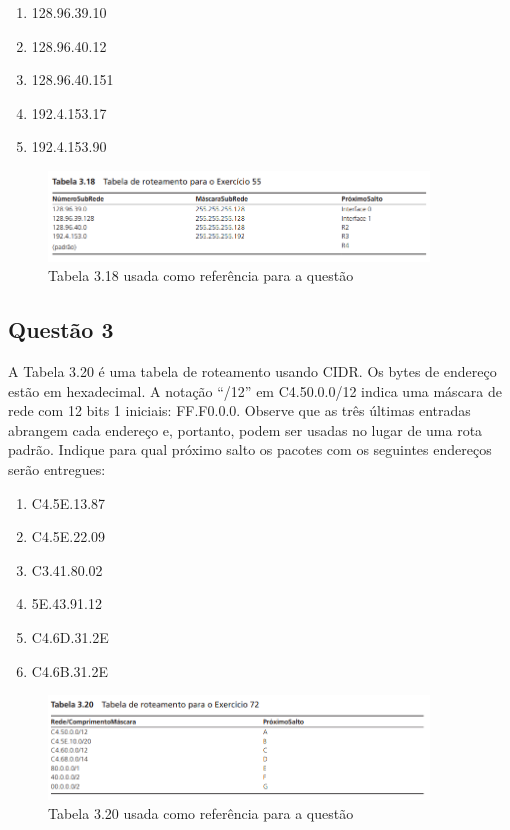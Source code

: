 \begin{enumerate}[label=\alph*.]
    \item 128.96.39.10
    \item 128.96.40.12
    \item 128.96.40.151
    \item 192.4.153.17
    \item 192.4.153.90
\end{enumerate}

\begin{figure}[H]
    \centering
    \includegraphics[width=0.9\textwidth]{images/tabela_3_18.png}
    \caption{Tabela 3.18 usada como referência para a questão} 
    \label{fig:questao_2_tabela}
\end{figure}

\subsection{Questão 3}
A Tabela 3.20 é uma tabela de roteamento usando CIDR. Os bytes de endereço estão em
hexadecimal. A notação “/12” em C4.50.0.0/12 indica uma máscara de rede com 12 bits 1 iniciais:
FF.F0.0.0. Observe que as três últimas entradas abrangem cada endereço e, portanto, podem ser usadas no lugar de uma rota padrão. 
Indique para qual próximo salto os pacotes com os seguintes endereços serão entregues:

\begin{enumerate}[label=\alph*.]
    \item C4.5E.13.87
    \item C4.5E.22.09
    \item C3.41.80.02
    \item 5E.43.91.12
    \item C4.6D.31.2E
    \item C4.6B.31.2E
\end{enumerate}

\begin{figure}[H]
    \centering
    \includegraphics[width=0.9\textwidth]{images/tabela_3_20.png}
    \caption{Tabela 3.20 usada como referência para a questão} 
    \label{fig:questao_3_tabela}
\end{figure}

